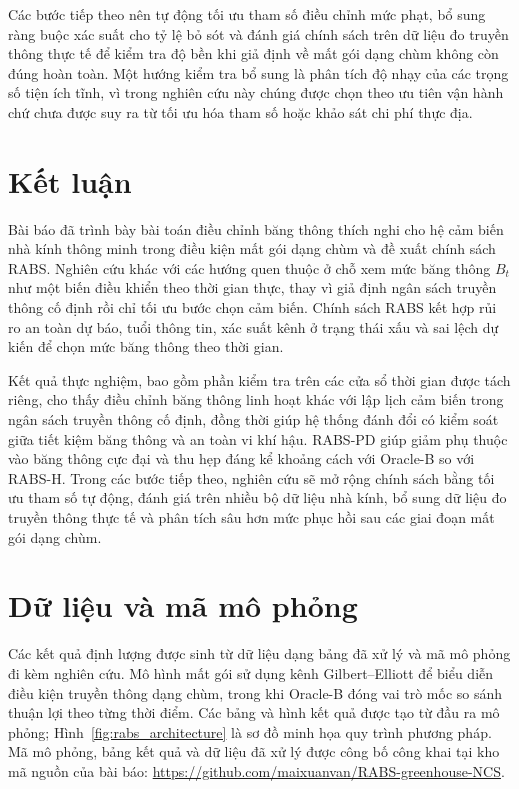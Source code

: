 \documentclass[10pt]{article}
\begin{document}
Các bước tiếp theo nên tự động tối ưu tham số điều chỉnh mức phạt, bổ sung ràng buộc xác suất cho tỷ lệ bỏ sót và đánh giá chính sách trên dữ liệu đo truyền thông thực tế để kiểm tra độ bền khi giả định về mất gói dạng chùm không còn đúng hoàn toàn. Một hướng kiểm tra bổ sung là phân tích độ nhạy của các trọng số tiện ích tĩnh, vì trong nghiên cứu này chúng được chọn theo ưu tiên vận hành chứ chưa được suy ra từ tối ưu hóa tham số hoặc khảo sát chi phí thực địa.

\section{Kết luận}
Bài báo đã trình bày bài toán điều chỉnh băng thông thích nghi cho hệ cảm biến nhà kính thông minh trong điều kiện mất gói dạng chùm và đề xuất chính sách RABS. Nghiên cứu khác với các hướng quen thuộc ở chỗ xem mức băng thông $B_t$ như một biến điều khiển theo thời gian thực, thay vì giả định ngân sách truyền thông cố định rồi chỉ tối ưu bước chọn cảm biến. Chính sách RABS kết hợp rủi ro an toàn dự báo, tuổi thông tin, xác suất kênh ở trạng thái xấu và sai lệch dự kiến để chọn mức băng thông theo thời gian.

Kết quả thực nghiệm, bao gồm phần kiểm tra trên các cửa sổ thời gian được tách riêng, cho thấy điều chỉnh băng thông linh hoạt khác với lập lịch cảm biến trong ngân sách truyền thông cố định, đồng thời giúp hệ thống đánh đổi có kiểm soát giữa tiết kiệm băng thông và an toàn vi khí hậu. RABS-PD giúp giảm phụ thuộc vào băng thông cực đại và thu hẹp đáng kể khoảng cách với Oracle-B so với RABS-H. Trong các bước tiếp theo, nghiên cứu sẽ mở rộng chính sách bằng tối ưu tham số tự động, đánh giá trên nhiều bộ dữ liệu nhà kính, bổ sung dữ liệu đo truyền thông thực tế và phân tích sâu hơn mức phục hồi sau các giai đoạn mất gói dạng chùm.

\section*{Dữ liệu và mã mô phỏng}
Các kết quả định lượng được sinh từ dữ liệu dạng bảng đã xử lý và mã mô phỏng đi kèm nghiên cứu. Mô hình mất gói sử dụng kênh Gilbert--Elliott để biểu diễn điều kiện truyền thông dạng chùm, trong khi Oracle-B đóng vai trò mốc so sánh thuận lợi theo từng thời điểm. Các bảng và hình kết quả được tạo từ đầu ra mô phỏng; Hình~\ref{fig:rabs_architecture} là sơ đồ minh họa quy trình phương pháp. Mã mô phỏng, bảng kết quả và dữ liệu đã xử lý được công bố công khai tại kho mã nguồn của bài báo: \url{https://github.com/maixuanvan/RABS-greenhouse-NCS}.
\end{document}

